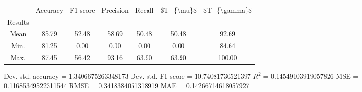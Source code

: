 \begin{tabular}{|c|c|c|c|c|c|c|}
\toprule
{} &  Accuracy &  F1 score &  Precision &  Recall &  \$T\_\{\textbackslash mu\}\$ &  \$T\_\{\textbackslash gamma\}\$ \\
Results &           &           &            &         &            &               \\
\hline
Mean    &     85.79 &     52.48 &      58.69 &   50.48 &      50.48 &         92.69 \\
Min.    &     81.25 &      0.00 &       0.00 &    0.00 &       0.00 &         84.64 \\
Max.    &     87.45 &     56.42 &      93.16 &   63.90 &      63.90 &        100.00 \\
\bottomrule
\end{tabular}

 Dev. std. accuracy = 1.3406675263348173
 Dev. std. F1-score = 10.74081730521397
 $R^2$ = 0.14549103919057826
 MSE = 0.11685349522311544
 RMSE = 0.3418384051318919
 MAE = 0.14266714618057927